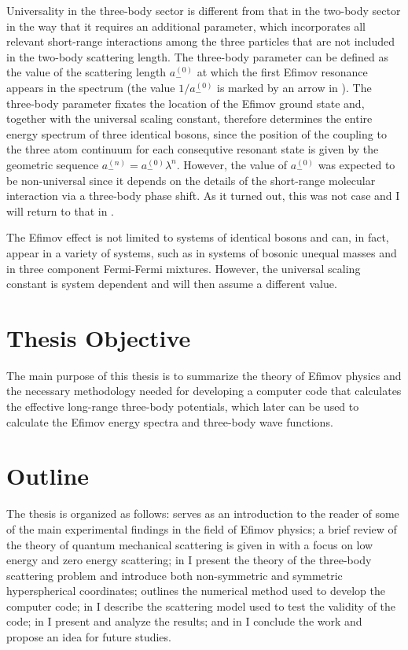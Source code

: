Universality in the three-body sector is different from that in the two-body sector in the way that it requires an additional parameter, which incorporates all relevant short-range interactions among the three particles that are not included in the two-body scattering length. The three-body parameter can be defined as the value of the scattering length $a_-^{(0)}$ at which the first Efimov resonance appears in the spectrum (the value $1/a_-^{(0)}$ is marked by an arrow in ). The three-body parameter fixates the location of the Efimov ground state and, together with the universal scaling constant, therefore determines the entire energy spectrum of three identical bosons, since the position of the coupling to the three atom continuum for each consequtive resonant state is given by the geometric sequence $a_-^{(n)}=a_-^{(0)}\lambda^n$. However, the value of $a_-^{(0)}$ was expected to be non-universal since it depends on the details of the short-range molecular interaction via a three-body phase shift. As it turned out, this was not case and I will return to that in .

The Efimov effect is not limited to systems of identical bosons and can, in fact, appear in a variety of systems, such as in systems of bosonic unequal masses and in three component Fermi-Fermi mixtures. However, the universal scaling constant is system dependent and will then assume a different value. 

\section{Thesis Objective}
The main purpose of this thesis is to summarize the theory of Efimov physics and the necessary methodology needed for developing a computer code that calculates the effective long-range three-body potentials, which later can be used to calculate the Efimov energy spectra and three-body wave functions. 

\section{Outline}
The thesis is organized as follows:  serves as an introduction to the reader of some of the main experimental findings in the field of Efimov physics; a brief review of the theory of quantum mechanical scattering is given in  with a focus on low energy and zero energy scattering; in  I present the theory of the three-body scattering problem and introduce both non-symmetric and symmetric hyperspherical coordinates;  outlines the numerical method used to develop the computer code; in  I describe the scattering model used to test the validity of the code; in  I present and analyze the results; and in  I conclude the work and propose an idea for future studies.
